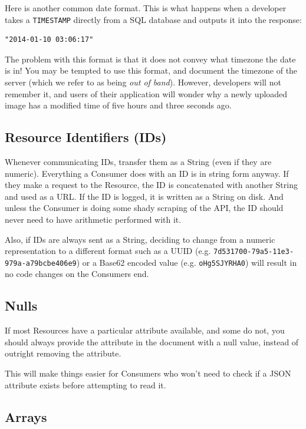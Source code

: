 \documentclass{book}
\begin{document}
Here is another common date format. This is what happens when a developer takes a \texttt{TIMESTAMP} directly from a SQL database and outputs it into the response:

\begin{verbatim}
"2014-01-10 03:06:17"
\end{verbatim}

The problem with this format is that it does not convey what timezone the date is in! You may be tempted to use this format, and document the timezone of the server (which we refer to as being \emph{out of band}). However, developers will not remember it, and users of their application will wonder why a newly uploaded image has a modified time of five hours and three seconds ago.

\subsection{Resource Identifiers (IDs)}

Whenever communicating IDs, transfer them as a String (even if they are numeric). Everything a Consumer does with an ID is in string form anyway. If they make a request to the Resource, the ID is concatenated with another String and used as a URL. If the ID is logged, it is written as a String on disk. And unless the Consumer is doing some shady scraping of the API, the ID should never need to have arithmetic performed with it.

Also, if IDs are always sent as a String, deciding to change from a numeric representation to a different format such as a UUID (e.g. \texttt{7d531700-79a5-11e3-979a-a79bcbe406e9}) or a Base62 encoded value (e.g. \texttt{oHg5SJYRHA0}) will result in no code changes on the Consumers end.

\subsection{Nulls}

If most Resources have a particular attribute available, and some do not, you should always provide the attribute in the document with a null value, instead of outright removing the attribute.

This will make things easier for Consumers who won't need to check if a JSON attribute exists before attempting to read it.

\subsection{Arrays}
\end{document}
